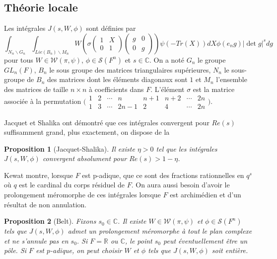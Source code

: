 \documentclass{amsart}
\newtheorem{proposition}{Proposition}[section]
\begin{document}
\subsection{Théorie locale}
Les intégrales $J(s, W, \phi)$ sont définies par
 \begin{equation}
\int_{N_n\backslash{G_n}} \int_{Lie(B_n)\backslash{M_n}} W\left(\sigma \begin{pmatrix}
1 & X \\
0 & 1
\end{pmatrix}\begin{pmatrix}
g & 0 \\
0 & g
\end{pmatrix}\right)\psi(-Tr(X))dX\phi(e_ng)|\det g|^s dg
 \end{equation}
pour tous $W \in \mathcal{W}(\pi, \psi)$, $\phi \in \mathcal{S}(F^n)$ et $s \in \mathbb{C}$. On a noté $G_n$ le groupe $GL_n(F)$, $B_n$ le sous groupe des matrices triangulaires supérieures, $N_n$ le sous-groupe de $B_n$ des matrices dont les éléments diagonaux sont $1$ et $M_n$ l'ensemble des matrices de taille $n \times n$ à coefficients dans $F$. L'élément $\sigma$ est la matrice associée à la permutation $\bigl(\begin{smallmatrix}
    1 & 2 & \cdots & n & n+1 & n+2 & \cdots & 2n \\
    1 & 3 & \cdots &  2n-1  & 2 & 4 & \cdots & 2n
  \end{smallmatrix}\bigr).$
  
  Jacquet et Shalika ont démontré que ces intégrales convergent pour $Re(s)$ suffisamment grand, plus exactement, on dispose de la
  \begin{proposition}[Jacquet-Shalika]
  Il existe $\eta > 0$ tel que les intégrales $J(s, W, \phi)$ convergent absolument pour $Re(s) > 1 - \eta$.
  \end{proposition}
  
  Kewat montre, lorsque $F$ est p-adique, que ce sont des fractions rationnelles en $q^{s}$ où $q$ est le cardinal du corps résiduel de $F$. On aura aussi besoin d'avoir le prolongement méromorphe de ces intégrales lorsque $F$ est archimédien et d'un résultat de non annulation.
  \begin{proposition}[Belt]
  \label{nonzero}
  Fixons $s_0 \in \mathbb{C}$. Il existe $W \in \mathcal{W}(\pi, \psi)$ et $\phi \in \mathcal{S}(F^n)$ tels que $J(s,W,\phi)$ admet un prolongement méromorphe à tout le plan complexe et ne s'annule pas en $s_0$. Si $F=\mathbb{R}$ ou $\mathbb{C}$, le point $s_0$ peut éventuellement être un pôle. Si $F$ est $p$-adique, on peut choisir $W$ et $\phi$ tels que $J(s, W, \phi)$ soit entière.
  \end{proposition}
  
\end{document}
